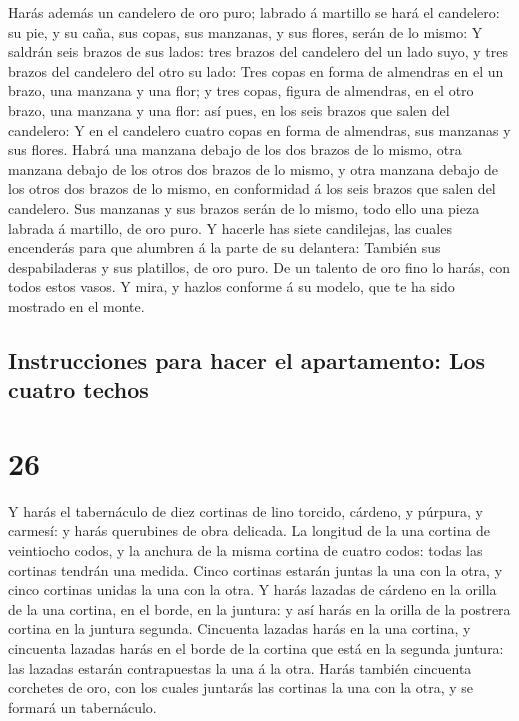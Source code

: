  Harás además un candelero de oro puro; labrado á
martillo se hará el candelero: su pie, y su caña, sus copas, sus
manzanas, y sus flores, serán de lo mismo:  Y saldrán
seis brazos de sus lados: tres brazos del candelero del un lado suyo, y
tres brazos del candelero del otro su lado:  Tres copas
en forma de almendras en el un brazo, una manzana y una flor; y tres
copas, figura de almendras, en el otro brazo, una manzana y una flor:
así pues, en los seis brazos que salen del candelero:  Y
en el candelero cuatro copas en forma de almendras, sus manzanas y sus
flores.  Habrá una manzana debajo de los dos brazos de lo
mismo, otra manzana debajo de los otros dos brazos de lo mismo, y otra
manzana debajo de los otros dos brazos de lo mismo, en conformidad á los
seis brazos que salen del candelero.  Sus manzanas y sus
brazos serán de lo mismo, todo ello una pieza labrada á martillo, de oro
puro.  Y hacerle has siete candilejas, las cuales
encenderás para que alumbren á la parte de su delantera: 
También sus despabiladeras y sus platillos, de oro puro. 
De un talento de oro fino lo harás, con todos estos vasos.
 Y mira, y hazlos conforme á su modelo, que te ha sido
mostrado en el monte.

\hypertarget{instrucciones-para-hacer-el-apartamento-los-cuatro-techos}{%
\subsection{Instrucciones para hacer el apartamento: Los cuatro
techos}\label{instrucciones-para-hacer-el-apartamento-los-cuatro-techos}}

\hypertarget{section-02-26}{%
\section{26}\label{section-02-26}}

 Y harás el tabernáculo de diez cortinas de lino torcido,
cárdeno, y púrpura, y carmesí: y harás querubines de obra delicada.
 La longitud de la una cortina de veintiocho codos, y la
anchura de la misma cortina de cuatro codos: todas las cortinas tendrán
una medida.  Cinco cortinas estarán juntas la una con la
otra, y cinco cortinas unidas la una con la otra.  Y harás
lazadas de cárdeno en la orilla de la una cortina, en el borde, en la
juntura: y así harás en la orilla de la postrera cortina en la juntura
segunda.  Cincuenta lazadas harás en la una cortina, y
cincuenta lazadas harás en el borde de la cortina que está en la segunda
juntura: las lazadas estarán contrapuestas la una á la otra.
 Harás también cincuenta corchetes de oro, con los cuales
juntarás las cortinas la una con la otra, y se formará un tabernáculo.

